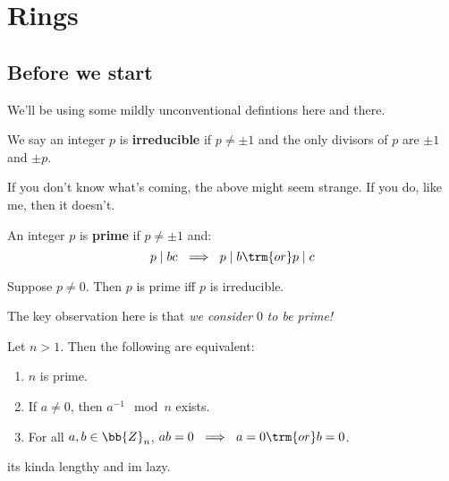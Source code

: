 \documentclass{article}
\begin{document}
\cover
\toc
\blurb


\section{Rings}
\subsection{Before we start}

We'll be using some mildly unconventional defintions here and there.

\begin{defn}
    We say an integer $ p $ is \textbf{irreducible} if $ p \neq \pm 1 $ and the
    only divisors of $ p $ are $ \pm 1 $ and $ \pm p $.
\end{defn}

If you don't know what's coming, the above might seem strange.
If you do, like me, then it doesn't.

\begin{defn}
    An integer $ p $ is \textbf{prime} if $ p \neq \pm1 $ and:
    \begin{equation*}
        p \mid bc \ \implies \ p \mid b \trm{ or } p \mid c
    \end{equation*}
\end{defn}

\begin{crll}
    Suppose $ p \neq 0 $. Then $ p $ is prime iff $ p $ is irreducible.
\end{crll}

The key observation here is that \textit{we consider} $ 0 $ \textit{to be prime!}

\begin{thm}
    Let $ n > 1 $. Then the following are equivalent:
    \begin{enumerate}
        \item $ n $ is prime.
        \item If $ a \neq 0 $, then $ a^{-1} \mod n $ exists.
        \item For all $ a, b \in \bb{Z}_{n} $, $ ab = 0 \ \implies \ a = 0 \trm{ or } b = 0 $.
    \end{enumerate}
\end{thm}

\begin{pf}[source=Primary Source Material]
    its kinda lengthy and im lazy.
\end{pf}
\end{document}
